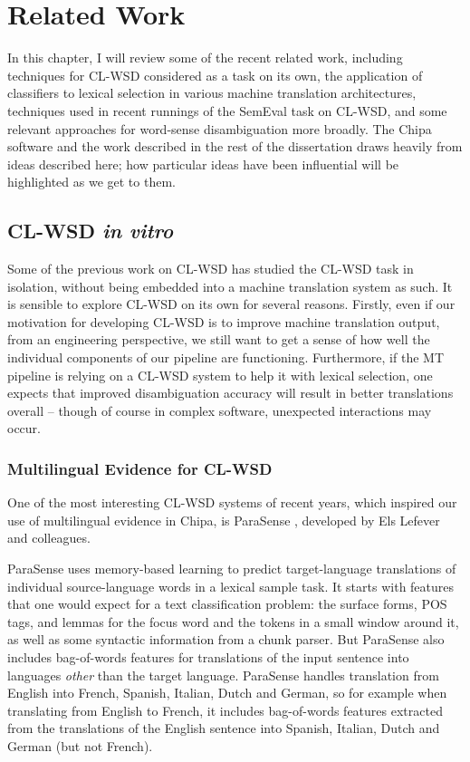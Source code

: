 \chapter{Related Work}
\label{chap:relatedwork}

In this chapter, I will review some of the recent related work, including
techniques for CL-WSD considered as a task on its own, the application of
classifiers to lexical selection in various machine translation architectures,
techniques used in recent runnings of the SemEval task on CL-WSD, and some
relevant approaches for word-sense disambiguation more broadly. The Chipa
software and the work described in the rest of the dissertation draws heavily
from ideas described here; how particular ideas have been influential will be
highlighted as we get to them.


\section{CL-WSD \emph{in vitro}}
Some of the previous work on CL-WSD has studied the CL-WSD task in isolation, 
without being embedded into a machine translation system as such.
It is sensible to explore CL-WSD on its own for several reasons. Firstly, even
if our motivation for developing CL-WSD is to improve machine translation
output, from an engineering perspective, we still want to get a sense of
how well the individual components of our pipeline are functioning.
Furthermore, if the MT pipeline is relying on a CL-WSD system to help it with
lexical selection, one expects that improved disambiguation accuracy will
result in better translations overall -- though of course in complex software,
unexpected interactions may occur.


\subsection{Multilingual Evidence for CL-WSD}
One of the most interesting CL-WSD systems of recent years, which inspired our
use of multilingual evidence in Chipa, is ParaSense
\cite{lefever-hoste-decock:2011:ACL-HLT2011}, developed by Els Lefever and
colleagues.

ParaSense uses memory-based learning to predict target-language translations of
individual source-language words in a lexical sample task. It starts with
features that one would expect for a text classification problem: the surface
forms, POS tags, and lemmas for the focus word and the tokens in a small window
around it, as well as some syntactic information from a chunk parser. But
ParaSense also includes bag-of-words features for translations of the input
sentence into languages \emph{other} than the target language. ParaSense
handles translation from English into French, Spanish, Italian, Dutch and
German, so for example when translating from English to French, it includes
bag-of-words features extracted from the translations of the English sentence
into Spanish, Italian, Dutch and German (but not French).

